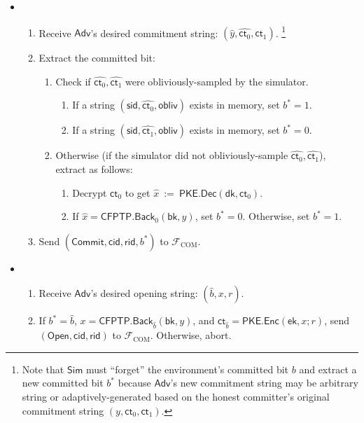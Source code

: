 \documentclass[11pt,letterpaper]{article}
\theoremstyle{plain} %
\theoremstyle{definition} %
\theoremstyle{remark} %
\newcommand{\eqdef}{\ {:=} \ }
\newcommand{\OpenMsg}{\mathsf{Open}}
\newcommand{\CommitMsg}{\mathsf{Commit}}
\newcommand{\obliv}{\mathsf{obliv}}
\newcommand{\Input}{x}
\newcommand{\PKE}{\mathsf{PKE}}
\newcommand{\Enc}{\mathsf{Enc}}
\newcommand{\Dec}{\mathsf{Dec}}
\newcommand{\EncKey}{\mathsf{ek}}
\newcommand{\DecKey}{\mathsf{dk}}
\newcommand{\ExtBit}{b^*}
\newcommand{\AdvBit}{\Adv{b}}
\newcommand{\Ct}{\mathsf{ct}}
\newcommand{\Rand}{r}
\newcommand{\CFPTP}{\mathsf{CFPTP}}
\newcommand{\Back}{\mathsf{Back}}
\newcommand{\BackKey}{\mathsf{bk}}
\newcommand{\Output}{y}
\newcommand{\Simulator}{{\mathsf{Sim}}} %
\newcommand{\Adversary}{{\mathsf{Adv}}} %
\newcommand{\Adv}[1]{\hat{#1}} %
\newcommand{\IF}{\mathcal{F}} %
\newcommand{\sid}{\mathsf{sid}}
\newcommand{\CommitterId}{\mathsf{cid}}
\newcommand{\ReceiverId}{\mathsf{rid}}
\newcommand{\IFCom}{\IF_{\mathrm{COM}}}
\newcommand{\CommBit}{b}
\begin{document}
\begin{itemize}
\item {}
\begin{enumerate}[nolistsep]
    \item Receive $\Adversary$'s desired commitment string: $(\Adv{\Output}, \Adv{\Ct_0}, \Adv{\Ct_1})$. \footnote{Note that $\Simulator$ must ``forget'' the environment's committed bit $\CommBit$ and extract a new committed bit $\ExtBit$ because $\Adversary$'s new commitment string may be arbitrary string or adaptively-generated based on the honest committer's original commitment string $(\Output, \Ct_0, \Ct_1)$.}
    \item Extract the committed bit:
    \begin{enumerate}[nolistsep]
        \item Check if $\Adv{\Ct_{0}}, \Adv{\Ct_{1}}$ were obliviously-sampled by the simulator.
        \begin{enumerate}[nolistsep]
            \item If a string $(\sid, \Adv{\Ct_{0}} ,\obliv)$ exists in memory, set $\ExtBit = 1$.
            \item If a string $(\sid, \Adv{\Ct_{1}} ,\obliv)$ exists in memory, set $\ExtBit = 0$.
        \end{enumerate}
        \item Otherwise (if the simulator did not obliviously-sample $\Adv{\Ct_{0}}, \Adv{\Ct_{1}}$), extract as follows:
        \begin{enumerate}[nolistsep]
            \item Decrypt $\Ct_0$ to get $\Adv{\Input} \eqdef \PKE.\Dec(\DecKey, \Ct_0)$.
            \item If $\Adv{\Input} = \CFPTP.\Back_0(\BackKey, \Output)$, set $\ExtBit = 0$. Otherwise, set $\ExtBit = 1$.
        \end{enumerate}
    \end{enumerate}
    \item Send $(\CommitMsg, \CommitterId, \ReceiverId, \ExtBit)$ to $\IFCom$.
\end{enumerate}

\item {}
\begin{enumerate}[nolistsep]
    \item Receive $\Adversary$'s desired opening string: $(\AdvBit, \Input, \Rand)$.
	\item If $\ExtBit = \AdvBit$, $\Input = \CFPTP.\Back_{\AdvBit}(\BackKey, \Output)$, and $\Ct_{\AdvBit} = \PKE.\Enc(\EncKey, \Input; \Rand)$, send $(\OpenMsg, \CommitterId, \ReceiverId)$ to $\IFCom$. Otherwise, abort.
\end{enumerate}

\end{itemize}
\end{document}
